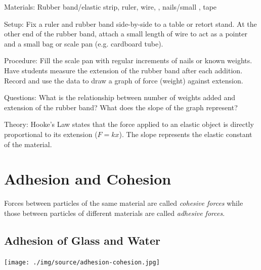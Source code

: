 \begin{multicols}{2}
\begin{description*}
\item[Materials:]{Rubber band/elastic strip, ruler, wire, , nails/small , tape}
\item[Setup:]{Fix a ruler and rubber band side-by-side to a table or retort stand. At the other end of the rubber band, attach a small length of wire to act as a pointer and a small bag or scale pan (e.g. cardboard tube).}
\item[Procedure:]{Fill the scale pan with regular increments of nails or known weights. Have students measure the extension of the rubber band after each addition. Record and use the data to draw a graph of force (weight) against extension.}
\item[Questions:]{What is the relationship between number of weights added and extension of the rubber band? What does the slope of the graph represent?}
\item[Theory:]{Hooke's Law states that the force applied to an elastic object is directly proportional to its extension ($F = kx$). The slope represents the elastic constant of the material. }
\end{description*}

\columnbreak


\section*{Adhesion and Cohesion}
Forces between particles of the same material are called \emph{cohesive forces} while those between particles of different materials are called \emph{adhesive forces}.


\subsection{Adhesion of Glass and Water}

\begin{center}
\texttt{[image: ./img/source/adhesion-cohesion.jpg]}
\end{center}


\end{multicols}
